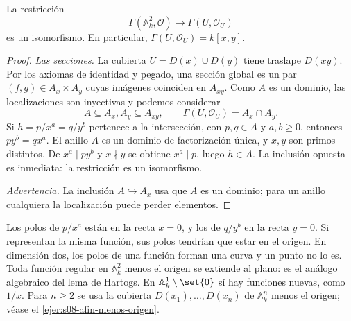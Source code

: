\begin{center}
\end{center}

\begin{prop}
\label{prop:s08-secciones-plano-menos-origen}
La restricción
\[
\Gamma(\mathbb A_k^2,\mathcal O)\longrightarrow\Gamma(U,\mathcal O_U)
\]
es un isomorfismo. En particular, $\Gamma(U,\mathcal O_U)=k[x,y]$.
\end{prop}
\begin{proof}
\emph{Las secciones.} La cubierta $U=D(x)\cup D(y)$ tiene traslape $D(xy)$. Por los axiomas de identidad y pegado, una sección global es un par $(f,g)\in A_x\times A_y$ cuyas imágenes coinciden en $A_{xy}$. Como $A$ es un dominio, las localizaciones son inyectivas y podemos considerar
\[
A\subseteq A_x,A_y\subseteq A_{xy},
\qquad \Gamma(U,\mathcal O_U)=A_x\cap A_y.
\]
Si $h=p/x^a=q/y^b$ pertenece a la intersección, con $p,q\in A$ y $a,b\geq0$, entonces $py^b=qx^a$. El anillo $A$ es un dominio de factorización única, y $x,y$ son primos distintos. De $x^a\mid py^b$ y $x\nmid y$ se obtiene $x^a\mid p$, luego $h\in A$. La inclusión opuesta es inmediata: la restricción es un isomorfismo.

\emph{Advertencia.} La inclusión $A\hookrightarrow A_x$ usa que $A$ es un dominio; para un anillo cualquiera la localización puede perder elementos.
\end{proof}

\begin{obs}
\label{obs:s08-hartogs}
Los polos de $p/x^a$ están en la recta $x=0$, y los de $q/y^b$ en la recta $y=0$. Si representan la misma función, sus polos tendrían que estar en el origen. En dimensión dos, los polos de una función forman una curva y un punto no lo es. Toda función regular en $\mathbb A_k^2$ menos el origen se extiende al plano: es el análogo algebraico del lema de Hartogs. En $\mathbb A_k^1\setminus\set{0}$ sí hay funciones nuevas, como $1/x$. Para $n\geq2$ se usa la cubierta $D(x_1),\ldots,D(x_n)$ de $\mathbb A_k^n$ menos el origen; véase el \cref{ejer:s08-afin-menos-origen}.
\end{obs}

